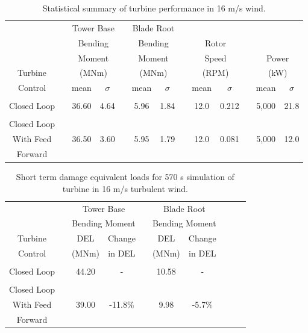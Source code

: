 \begin{table}
\centering
\begin{tabular}{ c | c c c c c c c c c c c c}
\hline
\hline
	& & \multicolumn{2}{c}{Tower Base}	& & \multicolumn{2}{c}{Blade Root}		& & \\
	& & \multicolumn{2}{c}{Bending}	& & \multicolumn{2}{c}{Bending}		& &\multicolumn{2}{c}{Rotor}	& & \\
	& & \multicolumn{2}{c}{Moment}	& & \multicolumn{2}{c}{Moment}		& &\multicolumn{2}{c}{Speed}		& &\multicolumn{2}{c}{Power} \\	
Turbine					& & \multicolumn{2}{c}{(MNm)}  					& & \multicolumn{2}{c}{(MNm)}	& & \multicolumn{2}{c}{(RPM)}	& & \multicolumn{2}{c}{(kW)}\\
\cline{3-4} \cline{6-7} \cline{9-10} \cline{12-13} 
Control & & mean & $\sigma$ & & mean & $\sigma$ & & mean & $\sigma$  & & mean & $\sigma$ \\
\hline
\\
Closed Loop  & & 36.60 & 4.64  & & 5.96 & 1.84  && 12.0 & 0.212&& 5,000  & 21.8 \\
 \\
Closed Loop\\
With Feed  & & 36.50 & 3.60  & & 5.95 & 1.79 && 12.0 & 0.081  && 5,000  & 12.0 \\
Forward\\
\hline
\hline
\end{tabular}
\caption{Statistical summary of turbine performance in 16 m/s wind.}
\label{Table3-5}
\end{table}

\begin{table}
\centering
\begin{tabular}{ c | c c c c c c c c c}
\hline
\hline
					&&\multicolumn{2}{c}{Tower Base}					&&\multicolumn{2}{c}{Blade	Root} \\
					&&\multicolumn{2}{c}{Bending Moment}			&&\multicolumn{2}{c}{Bending Moment}\\
						\cline{3-4} 														\cline{6-7}
Turbine			&& DEL   	& Change										&& DEL  	& Change\\
Control			&& (MNm)  & in DEL 										&& (MNm)  & in DEL 	\\
\hline
\\
Closed Loop  && 44.20 & - 													&& 10.58 & - \\
 \\
Closed Loop\\
With Feed  		&& 39.00 & -11.8$\%$ 									&& 9.98 & -5.7$\%$\\
Forward\\
\hline
\hline
\end{tabular}
\caption{Short term damage equivalent loads for 570 s simulation of turbine  in 16 m/s turbulent wind.}
\label{Table3-6}
\end{table}

